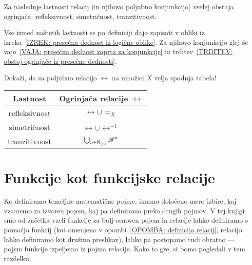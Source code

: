 		\begin{posledica}
			Za naslednje lastnosti relacij (in njihovo poljubno konjunkcijo) vselej obstaja ogrinjača: refleksivnost, simetričnost, tranzitivnost.
		\end{posledica}
		
		\begin{dokaz}
			Vse izmed naštetih lastnosti se po definiciji dajo zapisati v obliki iz izreka~\ref{IZREK: presečna dednost iz logične oblike}. Za njihovo konjunkcijo glej še vajo~\ref{VAJA: presečna dednost zaprta za konjunkcije} in trditev~\ref{TRDITEV: obstoj ogrinjače iz presečne dednosti}.
		\end{dokaz}
		
		\begin{vaja}
			Dokaži, da za poljubno relacijo $\rel$ na množici $X$ velja spodnja tabela!
			\begin{center}
				\begin{tabular}{|c|c|}
					\hline
					\textbf{Lastnost} & \textbf{Ogrinjača relacije $\rel$} \\
					\hline
					refleksivnost & $\rel \cup =_X$ \\
					simetričnost & $\rel \cup \rel^{-1}$ \\
					tranzitivnost & $\bigcup_{n \in \NN_{\geq 1}} \rel^n$ \\
					\hline
				\end{tabular}
			\end{center}
		\end{vaja}
		
	
	
	\section{Funkcije kot funkcijske relacije}\label{RAZDELEK: Funkcije kot funkcijske relacije}
	
		Ko definiramo temeljne matematične pojme, imamo določeno mero izbire, kaj vzamemo za izvoren pojem, kaj pa definiramo preko drugih pojmov. V tej knjigi smo od začetka vzeli funkcije za bolj osnoven pojem in relacije lahko definiramo s pomočjo funkcij (kot omenjeno v opombi~\ref{OPOMBA: definicija relacij}, relacijo lahko definiramo kot družino preslikav), lahko pa postopamo tudi obratno --- pojem funkcije izpeljemo iz pojma relacije. Kako to gre, si bomo pogledali v tem razdelku.
		
